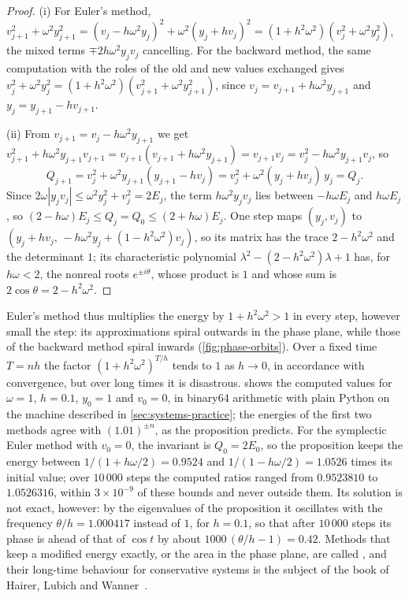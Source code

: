 \begin{proof}
(i) For Euler's method, $v_{j+1}^2+\omega^2y_{j+1}^2=(v_j-h\omega^2y_j)^2+\omega^2(y_j+hv_j)^2=(1+h^2\omega^2)(v_j^2+\omega^2y_j^2)$, the mixed terms $\mp2h\omega^2y_jv_j$ cancelling. For the backward method, the same computation with the roles of the old and new values exchanged gives $v_j^2+\omega^2y_j^2=(1+h^2\omega^2)(v_{j+1}^2+\omega^2y_{j+1}^2)$, since $v_j=v_{j+1}+h\omega^2y_{j+1}$ and $y_j=y_{j+1}-hv_{j+1}$.

(ii) From $v_{j+1}=v_j-h\omega^2y_{j+1}$ we get $v_{j+1}^2+h\omega^2y_{j+1}v_{j+1}=v_{j+1}(v_{j+1}+h\omega^2y_{j+1})=v_{j+1}v_j=v_j^2-h\omega^2y_{j+1}v_j$, so
\[
Q_{j+1}=v_j^2+\omega^2y_{j+1}(y_{j+1}-hv_j)=v_j^2+\omega^2(y_j+hv_j)\,y_j=Q_j .
\]
Since $2\omega|y_jv_j|\le\omega^2y_j^2+v_j^2=2E_j$, the term $h\omega^2y_jv_j$ lies between $-h\omega E_j$ and $h\omega E_j$, so $(2-h\omega)E_j\le Q_j=Q_0\le(2+h\omega)E_j$. One step maps $(y_j,v_j)$ to $(y_j+hv_j,\,-h\omega^2y_j+(1-h^2\omega^2)v_j)$, so its matrix has the trace $2-h^2\omega^2$ and the determinant $1$; its characteristic polynomial $\lambda^2-(2-h^2\omega^2)\lambda+1$ has, for $h\omega<2$, the nonreal roots $e^{\pm i\theta}$, whose product is $1$ and whose sum is $2\cos\theta=2-h^2\omega^2$.
\end{proof}

Euler's method thus multiplies the energy by $1+h^2\omega^2>1$ in every step, however small the step: its approximations spiral outwards in the phase plane, while those of the backward method spiral inwards (\cref{fig:phase-orbits}). Over a fixed time $T=nh$ the factor $(1+h^2\omega^2)^{T/h}$ tends to $1$ as $h\to0$, in accordance with convergence, but over long times it is disastrous.  shows the computed values for $\omega=1$, $h=0.1$, $y_0=1$ and $v_0=0$, in binary64 arithmetic with plain Python on the machine described in \cref{sec:systems-practice}; the energies of the first two methods agree with $(1.01)^{\pm n}$, as the proposition predicts. For the symplectic Euler method with $v_0=0$, the invariant is $Q_0=2E_0$, so the proposition keeps the energy between $1/(1+h\omega/2)=0.9524$ and $1/(1-h\omega/2)=1.0526$ times its initial value; over $10\,000$ steps the computed ratios ranged from $0.9523810$ to $1.0526316$, within $3\times10^{-9}$ of these bounds and never outside them. Its solution is not exact, however: by the eigenvalues of the proposition it oscillates with the frequency $\theta/h=1.000417$ instead of $1$, for $h=0.1$, so that after $10\,000$ steps its phase is ahead of that of $\cos t$ by about $1000\,(\theta/h-1)=0.42$. Methods that keep a modified energy exactly, or the area in the phase plane, are called , and their long-time behaviour for conservative systems is the subject of the book of Hairer, Lubich and Wanner~\cite{hairer2006geometric}.

